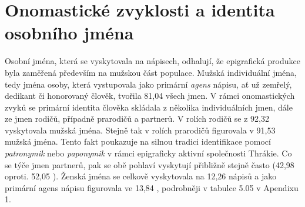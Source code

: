 
\section[onomastické-zvyklosti-a-identita-osobního-jména]{Onomastické zvyklosti a identita osobního jména}

Osobní jména, která se vyskytovala na nápisech, odhalují, že epigrafická produkce byla zaměřená především na mužskou část populace. Mužská individuální jména, tedy jména osoby, která vystupovala jako primární {\em agens} nápisu, ať už zemřelý, dedikant či honorovaný člověk, tvořila 81,04  všech jmen. V rámci onomastických zvyků se primární identita člověka skládala z několika individuálních jmen, dále ze jmen rodičů, případně prarodičů a partnerů. V rolích rodičů se z 92,32  vyskytovala mužská jména. Stejně tak v rolích prarodičů figurovala v 91,53  mužská jména. Tento fakt poukazuje na silnou tradici identifikace pomocí {\em patronymik} nebo {\em paponymik} v rámci epigraficky aktivní společnosti Thrákie. Co se týče jmen partnerů, pak se obě pohlaví vyskytují přibližně stejně často (42,98  oproti. 52,05 ). Ženská jména se celkově vyskytovala na 12,26  nápisů a jako primární agens nápisu figurovala ve 13,84 , podrobněji v tabulce 5.05 v Apendixu 1.

